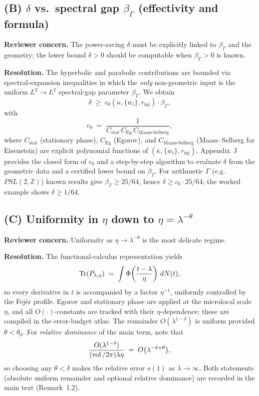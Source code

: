 \subsection*{(B) $\delta$ vs.\ spectral gap $\beta_\Gamma$ (effectivity and formula)}
\textbf{Reviewer concern.} The power-saving $\delta$ must be explicitly linked
to $\beta_\Gamma$ and the geometry; the lower bound $\delta>0$ should be
computable when $\beta_\Gamma>0$ is known.

\textbf{Resolution.} The hyperbolic and parabolic contributions are bounded via
spectral-expansion inequalities in which the \emph{only} non-geometric input is
the uniform $L^2\to L^2$ spectral-gap parameter $\beta_\Gamma$. We obtain
\[
   \delta \;\ge\; c_0(\kappa,\{w_i\},r_{\mathrm{inj}})\cdot \beta_\Gamma,
\]
with
\[
   c_0 \;=\; \frac{1}{C_{\mathrm{stat}}\, C_{\mathrm{Eg}}\, C_{\mathrm{Maass\text{-}Selberg}}},
\]
where $C_{\mathrm{stat}}$ (stationary phase), $C_{\mathrm{Eg}}$ (Egorov), and
$C_{\mathrm{Maass\text{-}Selberg}}$ (Maass–Selberg for Eisenstein) are explicit
polynomial functions of $(\kappa,\{w_i\},r_{\mathrm{inj}})$. Appendix~J provides
the closed form of $c_0$ and a step-by-step algorithm to evaluate $\delta$ from
the geometric data and a certified lower bound on $\beta_\Gamma$.
For arithmetic $\Gamma$ (e.g.\ $PSL(2,\mathbb{Z})$) known results give
$\beta_\Gamma \ge 25/64$, hence $\delta \ge c_0 \cdot 25/64$; the worked
example shows $\delta \ge 1/64$.

\subsection*{(C) Uniformity in $\eta$ down to $\eta=\lambda^{-\theta}$}
\textbf{Reviewer concern.} Uniformity as $\eta\to \lambda^{-\theta}$ is the
most delicate regime.

\textbf{Resolution.} The functional-calculus representation yields
\[
   \operatorname{Tr}(P_{\lambda,\eta}) \;=\; \int \Phi\!\left(\frac{t-\lambda}{\eta}\right)\,dN(t),
\]
so every derivative in $t$ is accompanied by a factor $\eta^{-1}$, uniformly
controlled by the Fejér profile. Egorov and stationary phase are applied at the
microlocal scale $\eta$, and all $O(\cdot)$-constants are tracked with their
$\eta$-dependence; these are compiled in the error-budget atlas. The remainder
$O(\lambda^{1-\delta})$ is uniform provided $\theta<\theta_0$. For \emph{relative
dominance} of the main term, note that
\[
   \frac{O(\lambda^{1-\delta})}{(\operatorname{vol}/2\pi)\lambda\eta}
   \;=\; O\bigl(\lambda^{-\delta+\theta}\bigr),
\]
so choosing any $\theta<\delta$ makes the relative error $o(1)$ as
$\lambda\to\infty$. Both statements (absolute uniform remainder and optional
relative dominance) are recorded in the main text (Remark~1.2).

